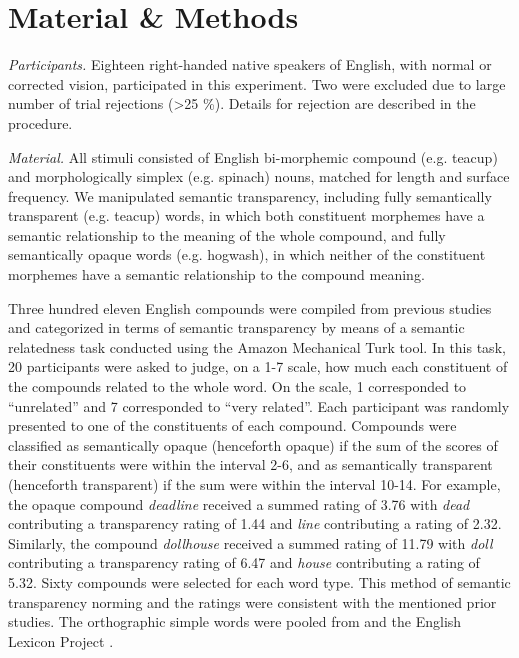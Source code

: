 \documentclass{frontiersSCNS}
\begin{document}
\section{Material \& Methods}

\textit{Participants.} Eighteen right-handed native speakers of English, with normal or corrected vision, participated in this experiment. Two were excluded due to large number of trial rejections (>25 \%). Details for rejection are described in the procedure.

\textit{Material.}  All stimuli consisted of English bi-morphemic compound (e.g. teacup) and morphologically simplex (e.g. spinach) nouns, matched for length and surface frequency. We manipulated semantic transparency, including fully semantically transparent (e.g. teacup) words, in which both constituent morphemes have a semantic relationship to the meaning of the whole compound, and fully semantically opaque words (e.g. hogwash), in which neither of the constituent morphemes have a semantic relationship to the compound meaning.

	Three hundred eleven English compounds were compiled from previous studies \citep*{Drieghe:2010, Fiorentino:2007, Fiorentino:2009, Juhasz:2003} and categorized in terms of semantic transparency by means of a semantic relatedness task conducted using the Amazon Mechanical Turk tool. In this task, 20 participants were asked to judge, on a 1-7 scale, how much each constituent of the compounds related to the whole word.  On the scale, 1 corresponded to “unrelated” and 7 corresponded to “very related”.  Each participant was randomly presented to one of the constituents of each compound.  Compounds were classified as semantically opaque (henceforth opaque) if the sum of the scores of their constituents were within the interval 2-6, and as semantically transparent (henceforth transparent) if the sum were within the interval 10-14. For example, the opaque compound \textit{deadline} received a summed rating of 3.76 with \textit{dead} contributing a transparency rating of 1.44 and \textit{line} contributing a rating of 2.32. Similarly, the compound \textit{dollhouse} received a summed rating of 11.79 with \textit{doll} contributing a transparency rating of 6.47 and \textit{house} contributing a rating of 5.32. Sixty compounds were selected for each word type. This method of semantic transparency norming and the ratings were consistent with the mentioned prior studies. The orthographic simple words were pooled from \citet{Rastle:2004} and the English Lexicon Project \citep*{Balota:2007}.	
	
\end{document}
